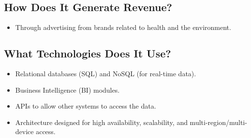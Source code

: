 \subsection*{How Does It Generate Revenue?}
\begin{itemize}
  \item Through advertising from brands related to health and the environment.
\end{itemize}

\subsection*{What Technologies Does It Use?}
\begin{itemize}
  \item Relational databases (SQL) and NoSQL (for real-time data).
  \item Business Intelligence (BI) modules.
  \item APIs to allow other systems to access the data.
  \item Architecture designed for high availability, scalability, and multi-region/multi-device access.
\end{itemize}
\newpage